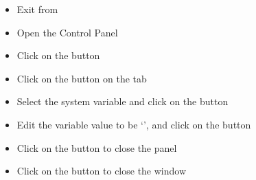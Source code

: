 \begin{itemize}
\item\exSp{}Exit from 
\item\exSp{}Open the  Control Panel
\item\exSp{}Click on the  button
\item\exSp{}Click on the  button on the 
tab
\item\exSp{}Select the  system variable and click on the
 button 
\item\exSp{}Edit the variable value to be
`', and
click on the  button
\item\exSp{}Click on the  button to close the 
panel
\item\exSp{}Click on the  button to close the 
window
\end{itemize}
\tertiaryEnd
{}
